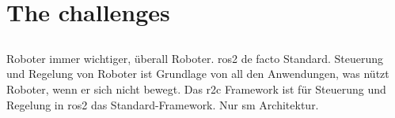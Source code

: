 \part{The challenges}
\chapter{}
\label{sec:Introduction}
Roboter immer wichtiger, überall Roboter. \gls{ros2} de facto Standard. Steuerung und Regelung von Roboter ist Grundlage von all den Anwendungen, was nützt Roboter, wenn er sich nicht bewegt. Das \gls{r2c} Framework ist für Steuerung und Regelung in \gls{ros2} das Standard-Framework. Nur \gls{sm} Architektur. 
